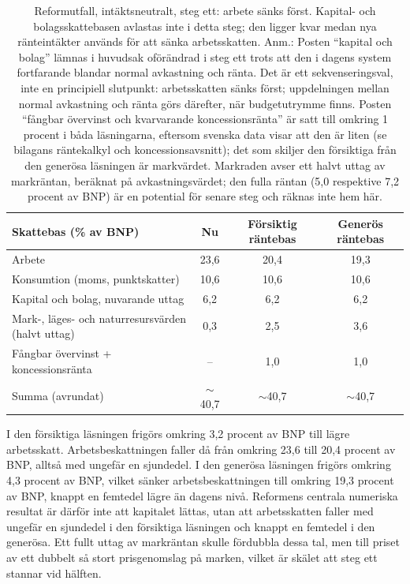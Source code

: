 \documentclass[11pt]{article}
\begin{document}
\begin{table}[h]
\small
\centering
\begin{tabular}{lccc}
\hline
\textbf{Skattebas (\% av BNP)} & \textbf{Nu} & \textbf{Försiktig räntebas} & \textbf{Generös räntebas} \\
\hline
Arbete & 23,6 & 20,4 & 19,3 \\
Konsumtion (moms, punktskatter) & 10,6 & 10,6 & 10,6 \\
Kapital och bolag, nuvarande uttag & 6,2 & 6,2 & 6,2 \\
Mark-, läges- och naturresursvärden (halvt uttag) & 0,3 & 2,5 & 3,6 \\
Fångbar övervinst + koncessionsränta & -- & 1,0 & 1,0 \\
\hline
Summa (avrundat) & $\sim$40,7 & $\sim$40,7 & $\sim$40,7 \\
\hline
\end{tabular}
\caption{Reformutfall, intäktsneutralt, steg ett: arbete sänks först. Kapital- och bolagsskattebasen avlastas inte i detta steg; den ligger kvar medan nya ränteintäkter används för att sänka arbetsskatten. \newline Anm.: Posten \enquote{kapital och bolag} lämnas i huvudsak oförändrad i steg ett trots att den i dagens system fortfarande blandar normal avkastning och ränta. Det är ett sekvenseringsval, inte en principiell slutpunkt: arbetsskatten sänks först; uppdelningen mellan normal avkastning och ränta görs därefter, när budgetutrymme finns. Posten \enquote{fångbar övervinst och kvarvarande koncessionsränta} är satt till omkring 1 procent i båda läsningarna, eftersom svenska data visar att den är liten (se bilagans räntekalkyl och koncessionsavsnitt); det som skiljer den försiktiga från den generösa läsningen är markvärdet. Markraden avser ett halvt uttag av markräntan, beräknat på avkastningsvärdet; den fulla räntan (5,0 respektive 7,2 procent av BNP) är en potential för senare steg och räknas inte hem här.}
\label{tab:reformutfall}
\end{table}

I den försiktiga läsningen frigörs omkring 3,2 procent av BNP till lägre arbetsskatt. Arbetsbeskattningen faller då från omkring 23,6 till 20,4 procent av BNP, alltså med ungefär en sjundedel. I den generösa läsningen frigörs omkring 4,3 procent av BNP, vilket sänker arbetsbeskattningen till omkring 19,3 procent av BNP, knappt en femtedel lägre än dagens nivå. Reformens centrala numeriska resultat är därför inte att kapitalet lättas, utan att arbetsskatten faller med ungefär en sjundedel i den försiktiga läsningen och knappt en femtedel i den generösa. Ett fullt uttag av markräntan skulle fördubbla dessa tal, men till priset av ett dubbelt så stort prisgenomslag på marken, vilket är skälet att steg ett stannar vid hälften.
\end{document}
